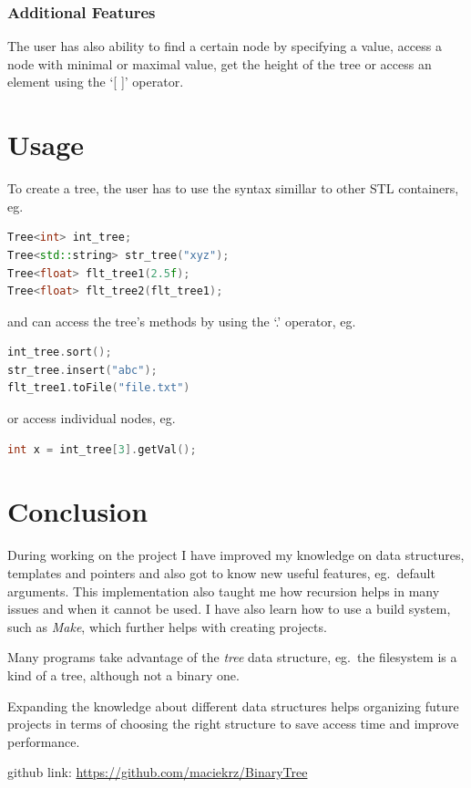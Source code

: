 \documentclass[12pt]{article}
\begin{document}
\subsubsection{Additional Features}
The user has also ability to find a certain node by specifying a value, access a node with minimal or maximal value, get the height of the tree or access an element using the `[  ]' operator.

\section{Usage}
To create a tree, the user has to use the syntax simillar to other STL containers, eg.\
\begin{footnotesize}
\begin{lstlisting}[language=C++]
Tree<int> int_tree;
Tree<std::string> str_tree("xyz");
Tree<float> flt_tree1(2.5f); 
Tree<float> flt_tree2(flt_tree1); 
\end{lstlisting}
\end{footnotesize}

and can access the tree's methods by using the `.' operator, eg.\
\begin{footnotesize}
\begin{lstlisting}[language=C++]
int_tree.sort();
str_tree.insert("abc");
flt_tree1.toFile("file.txt")
\end{lstlisting}
\end{footnotesize}

or access individual nodes, eg.\
\begin{footnotesize}
\begin{lstlisting}[language=C++]
int x = int_tree[3].getVal();
\end{lstlisting}
\end{footnotesize}

\section{Conclusion}
During working on the project I have improved my knowledge on data structures, templates and pointers and also got to know new useful features, eg.\ default arguments. This implementation also taught me how recursion helps in many issues and when it cannot be used. I have also learn how to use a build system, such as \textit{Make}, which further helps with creating projects.

Many programs take advantage of the \textit{tree} data structure, eg.\ the filesystem is a kind of a tree, although not a binary one. 

Expanding the knowledge about different data structures helps organizing future projects in terms of choosing the right structure to save access time and improve performance.

\vspace{2cm}
github link: \url{https://github.com/maciekrz/BinaryTree}
\end{document}
